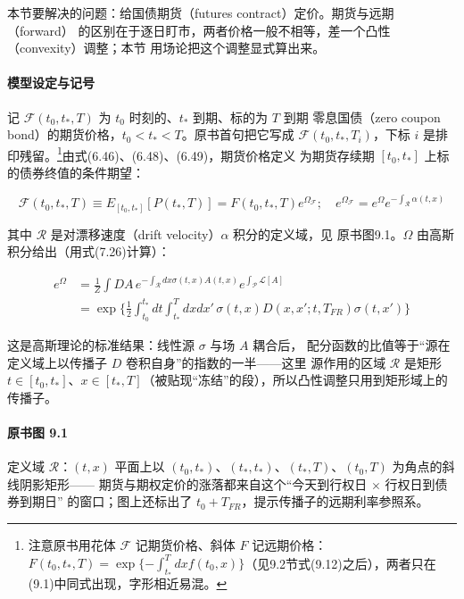 本节要解决的问题：给国债期货（futures contract）定价。期货与远期（forward）
的区别在于逐日盯市，两者价格一般不相等，差一个凸性（convexity）调整；本节
用场论把这个调整显式算出来。

\paragraph{模型设定与记号}
记 $\mathcal{F}(t_0,t_*,T)$ 为 $t_0$ 时刻的、$t_*$ 到期、标的为 $T$ 到期
零息国债（zero coupon bond）的期货价格，$t_0<t_*<T$。原书首句把它写成
$\mathcal{F}(t_0,t_*,T_i)$，下标 $i$ 是排印残留。\footnote{注意原书用花体
$\mathcal{F}$ 记期货价格、斜体 $F$ 记远期价格：$F(t_0,t_*,T)=
\exp\{-\int_{t_*}^{T}dxf(t_0,x)\}$（见9.2节式(9.12)之后），两者只在
(9.1)中同式出现，字形相近易混。}由式(6.46)、(6.48)、(6.49)，期货价格定义
为期货存续期 $[t_0,t_*]$ 上标的债券终值的条件期望：

\begin{equation*}
\mathcal{F}(t_0,t_*,T)\equiv E_{[t_0,t_*]}[P(t_*,T)]
=F(t_0,t_*,T)e^{\Omega_{\mathcal{F}}};\quad
e^{\Omega_{\mathcal{F}}}=e^{\Omega}e^{-\int_{\mathcal{R}}\alpha(t,x)}
\tag{9.1}
\end{equation*}

其中 $\mathcal{R}$ 是对漂移速度（drift velocity）$\alpha$ 积分的定义域，见
原书图9.1。$\Omega$ 由高斯积分给出（用式(7.26)计算）：

\begin{align*}
e^{\Omega}&=\frac{1}{Z}\int DA\,e^{-\int_{\mathcal{R}}dx\sigma(t,x)A(t,x)}
e^{\int_{\mathcal{P}}\mathcal{L}[A]}\tag{9.2}\\
&=\exp\biggl\{\frac{1}{2}\int_{t_0}^{t_*}dt\int_{t_*}^{T}dxdx'\,
\sigma(t,x)D(x,x';t,T_{FR})\sigma(t,x')\biggr\}\tag{9.3}
\end{align*}

这是高斯理论的标准结果：线性源 $\sigma$ 与场 $A$ 耦合后，
配分函数的比值等于“源在定义域上以传播子 $D$ 卷积自身”的指数的一半——这里
源作用的区域 $\mathcal{R}$ 是矩形 $t\in[t_0,t_*]$、$x\in[t_*,
T]$（被贴现“冻结”的段），所以凸性调整只用到矩形域上的传播子。

\paragraph{原书图 9.1}\quad 定义域 $\mathcal{R}$：$(t,x)$ 平面上以
$(t_0,t_*)$、$(t_*,t_*)$、$(t_*,T)$、$(t_0,T)$ 为角点的斜线阴影矩形——
期货与期权定价的涨落都来自这个“今天到行权日 $\times$ 行权日到债券到期日”
的窗口；图上还标出了 $t_0+T_{FR}$，提示传播子的远期利率参照系。

